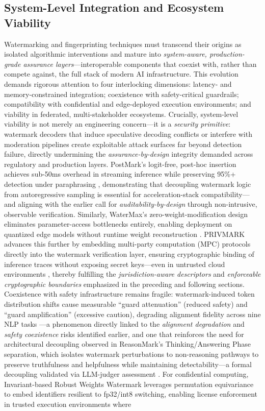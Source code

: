\documentclass[11pt,a4paper]{article}
\begin{document}
\subsection{System-Level Integration and Ecosystem Viability}


Watermarking and fingerprinting techniques must transcend their origins as isolated algorithmic interventions and mature into \emph{system-aware, production-grade assurance layers}---interoperable components that coexist with, rather than compete against, the full stack of modern AI infrastructure. This evolution demands rigorous attention to four interlocking dimensions: latency- and memory-constrained integration; coexistence with safety-critical guardrails; compatibility with confidential and edge-deployed execution environments; and viability in federated, multi-stakeholder ecosystems. Crucially, system-level viability is not merely an engineering concern---it is a \emph{security primitive}: watermark decoders that induce speculative decoding conflicts or interfere with moderation pipelines create exploitable attack surfaces far beyond detection failure, directly undermining the \emph{assurance-by-design} integrity demanded across regulatory and production layers. PostMark's logit-free, post-hoc insertion achieves sub-50ms overhead in streaming inference while preserving 95\%+ detection under paraphrasing \cite{arxiv:2305.08883}, demonstrating that decoupling watermark logic from autoregressive sampling is essential for acceleration-stack compatibility---and aligning with the earlier call for \emph{auditability-by-design} through non-intrusive, observable verification. Similarly, WaterMax's zero-weight-modification design eliminates parameter-access bottlenecks entirely, enabling deployment on quantized edge models without runtime weight reconstruction \cite{arxiv:2403.04808}. PRIVMARK advances this further by embedding multi-party computation (MPC) protocols directly into the watermark verification layer, ensuring cryptographic binding of inference traces without exposing secret keys---even in untrusted cloud environments \cite{doi:10.1109/dac56929.2023.10247798}, thereby fulfilling the \emph{jurisdiction-aware descriptors} and \emph{enforceable cryptographic boundaries} emphasized in the preceding and following sections. Coexistence with safety infrastructure remains fragile: watermark-induced token distribution shifts cause measurable ``guard attenuation'' (reduced safety) and ``guard amplification'' (excessive caution), degrading alignment fidelity across nine NLP tasks \cite{arxiv:2306.09194}---a phenomenon directly linked to the \emph{alignment degradation} and \emph{safety coexistence} risks identified earlier, and one that reinforces the need for architectural decoupling observed in ReasonMark's Thinking/Answering Phase separation, which isolates watermark perturbations to non-reasoning pathways to preserve truthfulness and helpfulness while maintaining detectability---a formal decoupling validated via LLM-judger assessment \cite{arxiv:2310.06356}. For confidential computing, Invariant-based Robust Weights Watermark leverages permutation equivariance to embed identifiers resilient to fp32/int8 switching, enabling license enforcement in trusted execution environments where 
\end{document}
